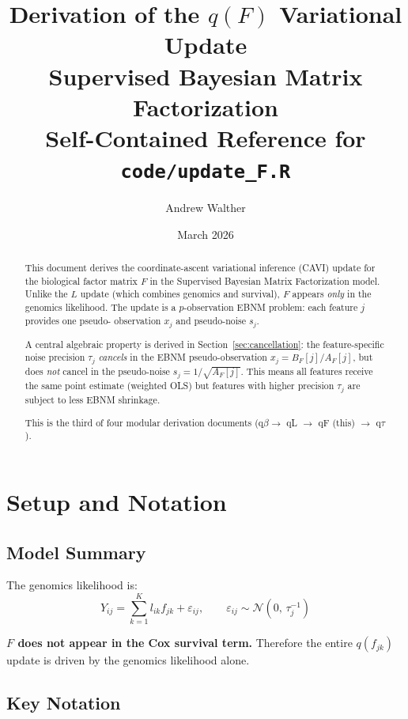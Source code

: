 \documentclass[11pt]{article}
\title{\textbf{Derivation of the $q(F)$ Variational Update}\\[4pt]
       \large Supervised Bayesian Matrix Factorization\\[4pt]
       \normalsize Self-Contained Reference for \texttt{code/update\_F.R}}
\author{Andrew Walther}
\date{March 2026}
\begin{document}
\maketitle

\begin{abstract}
This document derives the coordinate-ascent variational inference (CAVI)
update for the biological factor matrix $F$ in the Supervised Bayesian Matrix
Factorization model.  Unlike the $L$ update (which combines genomics and
survival), $F$ appears \emph{only} in the genomics likelihood.  The update
is a $p$-observation EBNM problem: each feature $j$ provides one pseudo-
observation $x_j$ and pseudo-noise $s_j$.

A central algebraic property is derived in Section~\ref{sec:cancellation}:
the feature-specific noise precision $\tau_j$ \emph{cancels} in the EBNM
pseudo-observation $x_j = B_F[j]/A_F[j]$, but does \emph{not} cancel in
the pseudo-noise $s_j = 1/\sqrt{A_F[j]}$.  This means all features receive
the same point estimate (weighted OLS) but features with higher precision
$\tau_j$ are subject to less EBNM shrinkage.

This is the third of four modular derivation documents
(q$\beta \to$ qL $\to$ qF (this) $\to$ q$\tau$).
\end{abstract}

\tableofcontents
\newpage

\section{Setup and Notation}\label{sec:setup}

\subsection{Model Summary}

The genomics likelihood is:
\begin{equation}
  Y_{ij} = \sum_{k=1}^K l_{ik} f_{jk} + \varepsilon_{ij},
  \qquad \varepsilon_{ij} \sim \mathcal{N}(0,\,\tau_j^{-1})
  \label{eq:genomics}
\end{equation}

\textbf{$F$ does not appear in the Cox survival term.}  Therefore the entire
$q(f_{jk})$ update is driven by the genomics likelihood alone.

\subsection{Key Notation}
\end{document}
